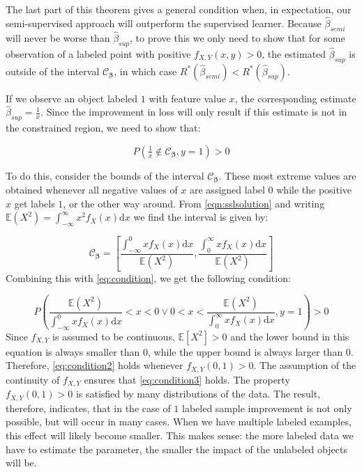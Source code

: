 \documentclass{llncs}
\begin{document}
The last part of this theorem gives a general condition when, in expectation, our semi-supervised approach will outperform the supervised learner. Because $\hat{\beta}_{semi}$ will never be worse than $\hat{\beta}_{sup}$, to prove this we only need to show that for some observation of a labeled point with positive $f_{X,Y}(x,y)>0$, the estimated $\hat{\beta}_{sup}$ is outside of the interval $\mathcal{C}_{\boldsymbol{\beta}}$, in which case $R^*(\hat{\beta}_{semi}) < R^*(\hat{\beta}_{sup})$. 

If we observe an object labeled $1$ with feature value $x$, the corresponding estimate $\hat{\beta}_{sup}=\tfrac{1}{x}$. Since the improvement in loss will only result if this estimate is not in the constrained region, we need to show that:

\begin{equation} \label{eq:condition}
P(\tfrac{1}{x} \notin \mathcal{C}_{\boldsymbol{\beta}},y=1)>0
\end{equation}

To do this, consider the bounds of the interval $\mathcal{C}_{\boldsymbol{\beta}}$. These most extreme values are obtained whenever all negative values of $x$ are assigned label $0$ while the positive $x$ get labels $1$, or the other way around. From \eqref{eqn:sslsolution} and writing $\mathbb{E}(X^2)=\int_{-\infty}^{\infty} { x^2 f_X(x) \mathrm{d}x}$ we find the interval is given by:  

\begin{equation} \label{eq:condition2}
\mathcal{C}_{\boldsymbol{\beta}}=\left[ \frac{\int_{-\infty}^{0}{x f_X(x) \mathrm{d}x }}{\mathbb{E}(X^2)},\frac{\int_{0}^{\infty}{x f_X(x)  \mathrm{d}x }}{\mathbb{E}(X^2)} \right]
\end{equation}
Combining this with \eqref{eq:condition}, we get the following condition:

\begin{equation} \label{eq:condition3}
P \left( \frac{\mathbb{E}(X^2)}{\int_{-\infty}^{0}{x f_X(x)  \mathrm{d}x }} < x < 0 \vee 0 < x < \frac{\mathbb{E}(X^2)}{\int_{0}^{\infty}{x f_X(x)  \mathrm{d}x }},y=1 \right) > 0
\end{equation}
Since $f_{X,Y}$ is assumed to be continuous, $\mathbb{E}[X^2]>0$ and the lower bound in this equation is always smaller than $0$, while the upper bound is always larger than $0$.  Therefore, \eqref{eq:condition2} holds whenever $f_{X,Y}(0,1)>0$. The assumption of the continuity of $f_{X,Y}$ ensures that  \eqref{eq:condition3} holds.  The property $f_{X,Y}(0,1)>0$ is satisfied by many distributions of the data. The result, therefore, indicates, that in the case of $1$ labeled sample improvement is not only possible, but will occur in many cases. When we have multiple labeled examples, this effect will likely become smaller. This makes sense: the more labeled data we have to estimate the parameter, the smaller the impact of the unlabeled objects will be.
\end{document}
